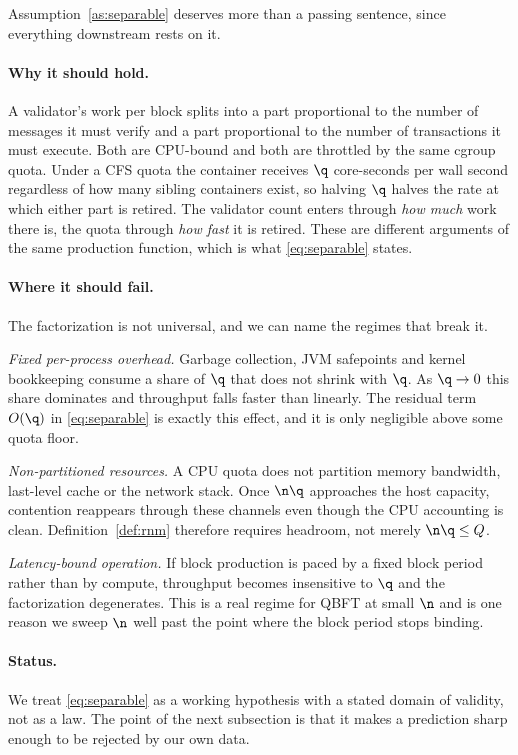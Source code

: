 Assumption~\ref{as:separable} deserves more than a passing sentence, since
everything downstream rests on it.

\paragraph{Why it should hold.}
A validator's work per block splits into a part proportional to the number of
messages it must verify and a part proportional to the number of transactions
it must execute. Both are CPU-bound and both are throttled by the same cgroup
quota. Under a CFS quota the container receives $\q$ core-seconds per wall
second regardless of how many sibling containers exist, so halving $\q$ halves
the rate at which either part is retired. The validator count enters through
\emph{how much} work there is, the quota through \emph{how fast} it is retired.
These are different arguments of the same production function, which is what
\eqref{eq:separable} states.

\paragraph{Where it should fail.}
The factorization is not universal, and we can name the regimes that break it.
\begin{enumerate*}
\item \emph{Fixed per-process overhead.} Garbage collection, JVM safepoints and
kernel bookkeeping consume a share of $\q$ that does not shrink with $\q$. As
$\q\to0$ this share dominates and throughput falls faster than linearly. The
residual term $O(\q)$ in \eqref{eq:separable} is exactly this effect, and it is
only negligible above some quota floor.
\item \emph{Non-partitioned resources.} A CPU quota does not partition memory
bandwidth, last-level cache or the network stack. Once $\n\q$ approaches the
host capacity, contention reappears through these channels even though the CPU
accounting is clean. Definition~\ref{def:rnm} therefore requires headroom, not
merely $\n\q\le Q$.
\item \emph{Latency-bound operation.} If block production is paced by a fixed
block period rather than by compute, throughput becomes insensitive to $\q$ and
the factorization degenerates. This is a real regime for QBFT at small $\n$ and
is one reason we sweep $\n$ well past the point where the block period stops
binding.
\end{enumerate*}

\paragraph{Status.}
We treat \eqref{eq:separable} as a working hypothesis with a stated domain of
validity, not as a law. The point of the next subsection is that it makes a
prediction sharp enough to be rejected by our own data.

